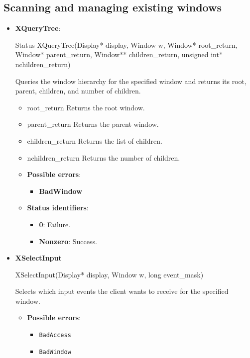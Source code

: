 \documentclass{report}
\begin{document}
    \subsection{Scanning and managing existing windows}
    \begin{itemize}
        \item \textbf{XQueryTree}:
            \bigbreak \noindent 
            \begin{cppcode}
            Status XQueryTree(Display* display, Window w, Window* root_return, Window* parent_return, Window** children_return, unsigned int* nchildren_return)
            \end{cppcode}
            \bigbreak \noindent
            Queries the window hierarchy for the specified window and returns its root, parent, children, and number of children.
            \begin{itemize}
                \item root\_return Returns the root window.
                \item parent\_return Returns the parent window.
                \item children\_return Returns the list of children.
                \item nchildren\_return Returns the number of children.
            \end{itemize}
            \begin{itemize}
                \item \textbf{Possible errors}:
                    \begin{itemize}
                        \item \textbf{BadWindow}
                    \end{itemize}
                \item \textbf{Status identifiers}:
                    \begin{itemize}
                        \item \textbf{0}: Failure.
                        \item \textbf{Nonzero}: Success.
                    \end{itemize}
            \end{itemize}
        \item \textbf{XSelectInput}
            \bigbreak \noindent 
            \begin{cppcode}
                XSelectInput(Display* display, Window w, long event_mask)
            \end{cppcode}
            \bigbreak \noindent
            Selects which input events the client wants to receive for the specified window.
            \begin{itemize}
                \item \textbf{Possible errors}:
                    \begin{itemize}
                        \item \texttt{BadAccess}
                        \item \texttt{BadWindow}
                    \end{itemize}
            \end{itemize}


\end{itemize}
\end{document}
